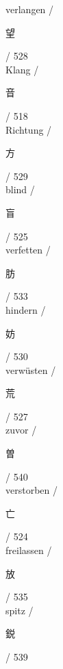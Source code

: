  \vspace{0.2cm}verlangen / {\Huge \begin{CJK}{UTF8}{min} 望 \end{CJK}} / 528\\
 \vspace{0.2cm}Klang / {\Huge \begin{CJK}{UTF8}{min} 音 \end{CJK}} / 518\\
 \vspace{0.2cm}Richtung / {\Huge \begin{CJK}{UTF8}{min} 方 \end{CJK}} / 529\\
 \vspace{0.2cm}blind / {\Huge \begin{CJK}{UTF8}{min} 盲 \end{CJK}} / 525\\
 \vspace{0.2cm}verfetten / {\Huge \begin{CJK}{UTF8}{min} 肪 \end{CJK}} / 533\\
 \vspace{0.2cm}hindern / {\Huge \begin{CJK}{UTF8}{min} 妨 \end{CJK}} / 530\\
 \vspace{0.2cm}verwüsten / {\Huge \begin{CJK}{UTF8}{min} 荒 \end{CJK}} / 527\\
 \vspace{0.2cm}zuvor / {\Huge \begin{CJK}{UTF8}{min} 曽 \end{CJK}} / 540\\
 \vspace{0.2cm}verstorben / {\Huge \begin{CJK}{UTF8}{min} 亡 \end{CJK}} / 524\\
 \vspace{0.2cm}freilassen / {\Huge \begin{CJK}{UTF8}{min} 放 \end{CJK}} / 535\\
 \vspace{0.2cm}spitz / {\Huge \begin{CJK}{UTF8}{min} 鋭 \end{CJK}} / 539\\
